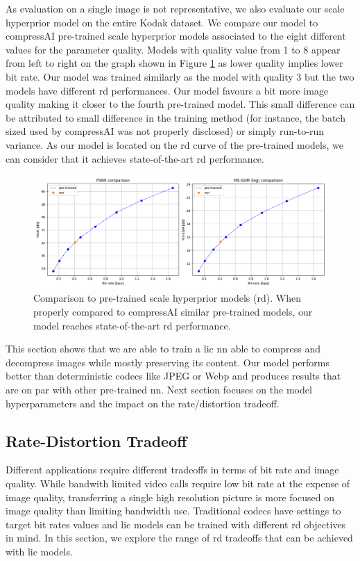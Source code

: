 As evaluation on a single image is not representative, we also evaluate our scale hyperprior model on the entire Kodak dataset. We compare our model to compressAI pre-trained scale hyperprior models associated to the eight different values for the parameter \textsf{quality}. Models with \textsf{quality} value from 1 to 8 appear from left to right on the graph shown in Figure \ref{balle_repro_6} as lower quality implies lower bit rate. Our model was trained similarly as the model with \textsf{quality} 3 but the two models have different \acrshort{rd} performances. Our model favours a bit more image quality making it closer to the fourth pre-trained model. This small difference can be attributed to small difference in the training method (for instance, the batch sized used by compressAI was not properly disclosed) or simply run-to-run variance. As our model is located on the \acrshort{rd} curve of the pre-trained models, we can consider that it achieves state-of-the-art \acrshort{rd} performance. 

\begin{figure}
    \centering
    \includegraphics[width=15cm]{img/balle_repro_rd_2.png}
    \caption[Comparison to pre-trained scale hyperprior models (\acrshort{rd}).]{Comparison to pre-trained scale hyperprior models (\acrshort{rd}). When properly compared to compressAI similar pre-trained models, our model reaches state-of-the-art \acrshort{rd} performance.}
    \label{balle_repro_6}
\end{figure}

This section shows that we are able to train a \acrshort{lic} \acrshort{nn} able to compress and decompress images while mostly preserving its content. Our model performs better than deterministic codecs like JPEG or Webp and produces results that are on par with other pre-trained \acrshort{nn}. Next section focuses on the model hyperparameters and the impact on the rate/distortion tradeoff.

\subsection{Rate-Distortion Tradeoff}
Different applications require different tradeoffs in terms of bit rate and image quality. While bandwith limited video calls require low bit rate at the expense of image quality, transferring a single high resolution picture is more focused on image quality than limiting bandwidth use. Traditional codecs have settings to target bit rates values and \acrshort{lic} models can be trained with different \acrshort{rd} objectives in mind. In this section, we explore the range of \acrshort{rd} tradeoffs that can be achieved with \acrshort{lic} models.

